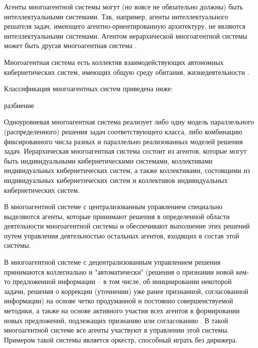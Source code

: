 \begin{SCn}
\end{SCn}


Агенты многоагентной системы могут (но вовсе не обязательно должны) быть интеллектуальными системами. 
Так, например, агенты интеллектуального решателя задач, имеющего агентно-ориентированную архитектуру, не являются интеллектуальными системами. 
Агентом иерархической многоагентной системы может быть другая многоагентная система .

Многоагентная система есть коллектив взаимодействующих автономных кибернетических систем, имеющих общую среду обитания, жизнедеятельности . 

Классификация многоагентных систем приведена ниже:

\begin{SCn}
\begin{scnrelfromset}{разбиение}
\end{scnrelfromset}
\end{SCn}

Одноуровневая многоагентная система реализует либо одну модель параллельного (распределенного) решения задач соответствующего класса, либо комбинацию фиксированного числа разных и параллельно реализованных моделей решения задач. 
Иерархическая многоагентная система состоит из агентов, которые могут быть индивидуальными кибернетическими системами, коллективами индивидуальных кибернетических систем, а также коллективами, состоящими из индивидуальных кибернетических систем и коллективов индивидуальных кибернетических систем.

В многоагентной системе с централизованным управлением специально выделяются агенты, которые принимают решения в определенной области деятельности многоагентной системы и обеспечивают выполнение этих решений путем управления деятельностью остальных агентов, входящих в состав этой системы.

В многоагентной системе с децентрализованным управлением решения принимаются коллегиально и "автоматически"{} (решения о признании новой кем-то предложенной информации – в том числе, об инициировании некоторой задачи, решения о коррекции (уточнении) уже ранее признанной, согласованной информации) на основе четко продуманной и постоянно совершенствуемой методики, а также на основе активного участия всех агентов в формировании новых предложений, подлежащих признанию или согласованию . 
В такой многоагентной системе все агенты участвуют в управлении этой системы. 
Примером такой системы является оркестр, способный играть без дирижера.




